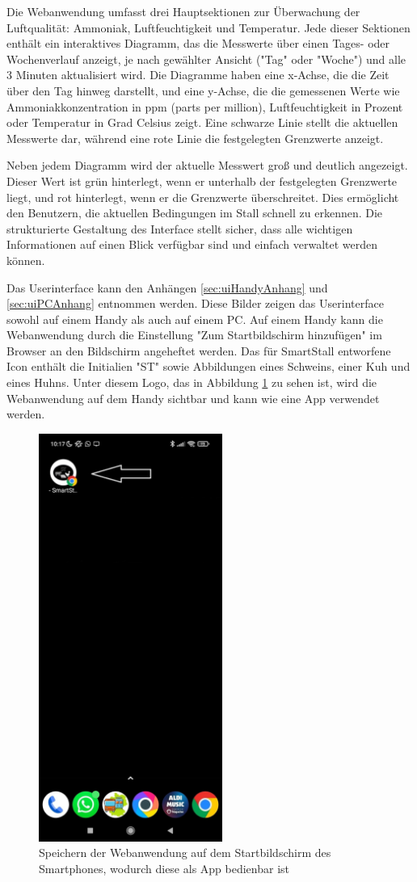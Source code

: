 \documentclass[conference]{IEEEtran}
\begin{document}
Die Webanwendung umfasst drei Hauptsektionen zur Überwachung der Luftqualität: Ammoniak, Luftfeuchtigkeit und Temperatur. Jede dieser Sektionen enthält ein interaktives Diagramm, das die Messwerte über einen Tages- oder Wochenverlauf anzeigt, je nach gewählter Ansicht ("Tag" oder "Woche") und alle 3 Minuten aktualisiert wird. Die Diagramme haben eine x-Achse, die die Zeit über den Tag hinweg darstellt, und eine y-Achse, die die gemessenen Werte wie Ammoniakkonzentration in ppm (parts per million), Luftfeuchtigkeit in Prozent oder Temperatur in Grad Celsius zeigt. Eine schwarze Linie stellt die aktuellen Messwerte dar, während eine rote Linie die festgelegten Grenzwerte anzeigt.

Neben jedem Diagramm wird der aktuelle Messwert groß und deutlich angezeigt. Dieser Wert ist grün hinterlegt, wenn er unterhalb der festgelegten Grenzwerte liegt, und rot hinterlegt, wenn er die Grenzwerte überschreitet. Dies ermöglicht den Benutzern, die aktuellen Bedingungen im Stall schnell zu erkennen.
Die strukturierte Gestaltung des Interface stellt sicher, dass alle wichtigen Informationen auf einen Blick verfügbar sind und einfach verwaltet werden können.

Das Userinterface kann den Anhängen  \ref{sec:uiHandyAnhang} und \ref{sec:uiPCAnhang} entnommen werden. Diese Bilder zeigen das Userinterface sowohl auf einem Handy als auch auf einem PC. Auf einem Handy kann die Webanwendung durch die Einstellung "Zum Startbildschirm hinzufügen" im Browser an den Bildschirm angeheftet werden. Das für SmartStall entworfene Icon enthält die Initialien "ST" sowie Abbildungen eines Schweins, einer Kuh und eines Huhns. Unter diesem Logo, das in Abbildung \ref{stApp} zu sehen ist, wird die Webanwendung auf dem Handy sichtbar und kann wie eine App verwendet werden.
\begin{figure}[H]
	\centering
	\includegraphics[width=60mm]{fig/stApp.jpg}
	\caption{Speichern der Webanwendung auf dem Startbildschirm des Smartphones, wodurch diese als App bedienbar ist}
	\label{stApp}
\end{figure}
\end{document}
